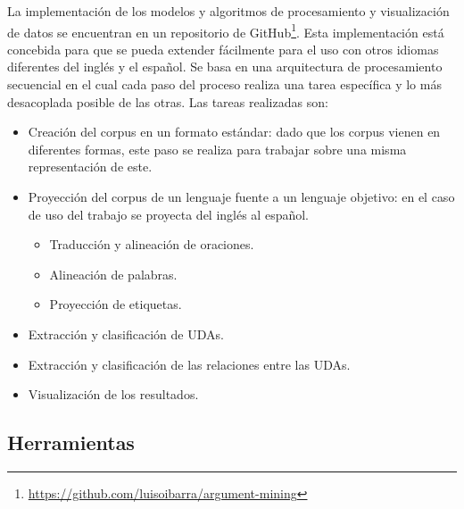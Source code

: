 La implementación de los modelos y algoritmos de procesamiento y visualización de datos se encuentran en 
un repositorio de GitHub\footnote{\url{https://github.com/luisoibarra/argument-mining}}. Esta implementación
está concebida para que se pueda extender fácilmente para el uso con otros idiomas diferentes del inglés y el 
español. Se basa en una arquitectura de procesamiento secuencial en el cual cada paso del proceso realiza
una tarea específica y lo más desacoplada posible de las otras. Las tareas realizadas son:

\begin{itemize}
    \item Creación del corpus en un formato estándar: dado que los corpus vienen en diferentes 
	formas, este paso se realiza para trabajar sobre una misma representación de este.
    \item Proyección del corpus de un lenguaje fuente a un lenguaje objetivo: en el caso de 
	uso del trabajo se proyecta del inglés al español.
    \begin{itemize}
        \item Traducción y alineación de oraciones.
        \item Alineación de palabras.
        \item Proyección de etiquetas.
    \end{itemize}
    \item Extracción y clasificación de UDAs.
    \item Extracción y clasificación de las relaciones entre las UDAs.
    \item Visualización de los resultados.
\end{itemize}

\subsection{Herramientas}

